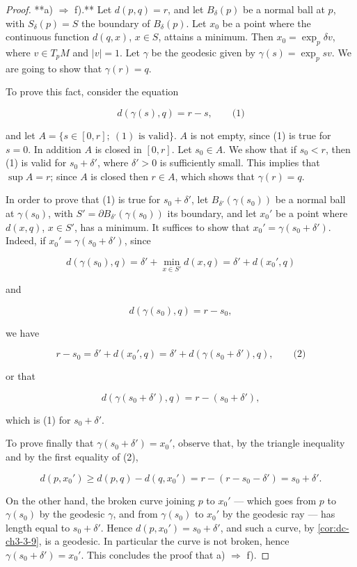 \begin{proof}
  \leanok
  **a) $\Rightarrow$ f).** Let $d(p,q)=r$, and let $B_\delta(p)$ be a normal ball at
  $p$, with $S_\delta(p)=S$ the boundary of $B_\delta(p)$. Let $x_0$ be a point
  where the continuous function $d(q,x)$, $x\in S$, attains a minimum. Then
  $x_0=\exp_p\delta v$, where $v\in T_pM$ and $|v|=1$. Let $\gamma$ be the geodesic
  given by $\gamma(s)=\exp_p sv$. We are going to show that $\gamma(r)=q$.
  
  To prove this fact, consider the equation
  
  $$
  d(\gamma(s),q)=r-s,\qquad\text{(1)}
  $$
  
  and let $A=\{s\in[0,r];\ (1)\text{ is valid}\}$. $A$ is not empty, since (1) is
  true for $s=0$. In addition $A$ is closed in $[0,r]$. Let $s_0\in A$. We show that
  if $s_0<r$, then (1) is valid for $s_0+\delta'$, where $\delta'>0$ is sufficiently
  small. This implies that $\sup A=r$; since $A$ is closed then $r\in A$, which
  shows that $\gamma(r)=q$.
  
  In order to prove that (1) is true for $s_0+\delta'$, let $B_{\delta'}(\gamma(s_0))$
  be a normal ball at $\gamma(s_0)$, with $S'=\partial B_{\delta'}(\gamma(s_0))$ its
  boundary, and let $x_0'$ be a point where $d(x,q)$, $x\in S'$, has a minimum. It
  suffices to show that $x_0'=\gamma(s_0+\delta')$. Indeed, if
  $x_0'=\gamma(s_0+\delta')$, since
  
  $$
  d(\gamma(s_0),q)=\delta'+\min_{x\in S'} d(x,q)=\delta'+d(x_0',q)
  $$
  
  and
  
  $$
  d(\gamma(s_0),q)=r-s_0,
  $$
  
  we have
  
  $$
  r-s_0=\delta'+d(x_0',q)=\delta'+d(\gamma(s_0+\delta'),q),\qquad\text{(2)}
  $$
  
  or that
  
  $$
  d(\gamma(s_0+\delta'),q)=r-(s_0+\delta'),
  $$
  
  which is (1) for $s_0+\delta'$.
  
  To prove finally that $\gamma(s_0+\delta')=x_0'$, observe that, by the triangle
  inequality and by the first equality of (2),
  
  $$
  d(p,x_0')\ge d(p,q)-d(q,x_0')=r-(r-s_0-\delta')=s_0+\delta'.
  $$
  
  On the other hand, the broken curve joining $p$ to $x_0'$ — which goes from $p$ to
  $\gamma(s_0)$ by the geodesic $\gamma$, and from $\gamma(s_0)$ to $x_0'$ by the
  geodesic ray — has length equal to $s_0+\delta'$. Hence $d(p,x_0')=s_0+\delta'$,
  and such a curve, by \cref{cor:dc-ch3-3-9}, is a geodesic. In particular the
  curve is not broken, hence $\gamma(s_0+\delta')=x_0'$. This concludes the proof
  that a) $\Rightarrow$ f).
  

\end{proof}
